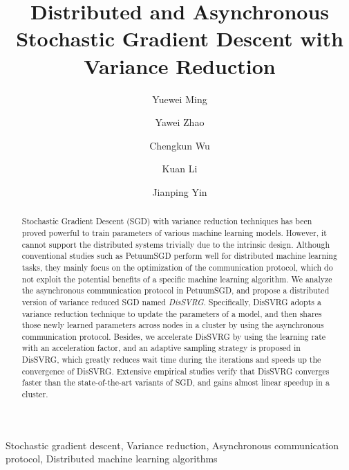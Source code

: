 \documentclass[preprint,review,11pt,a4paper]{elsarticle}
\begin{document}
\begin{frontmatter}

\title{Distributed and Asynchronous Stochastic Gradient Descent with Variance Reduction}

\author[mymainaddress]{Yuewei Ming}

\author[mymainaddress]{Yawei Zhao}
\author[mymainaddress]{Chengkun Wu}
\author[mymainaddress]{Kuan Li}
\author[mysecondaryaddress]{Jianping Yin}
\address[mymainaddress]{College of Computer,\\ National University of Defense Technology, Changsha 410073, China}
\address[mysecondaryaddress]{State Key Laboratory of High Performance Computing,\\ National University of Defense Technology, Changsha, 410073, China}

\begin{abstract}
Stochastic Gradient Descent (SGD) with variance reduction techniques has been proved powerful to train parameters of various machine learning models. However, it cannot support the distributed systems trivially due to the intrinsic design.  Although conventional studies such as PetuumSGD perform well for distributed machine learning tasks, they mainly focus on the optimization of the communication protocol, which do not exploit the potential benefits of a specific machine learning algorithm. We analyze the asynchronous communication protocol in PetuumSGD, and propose a distributed version of variance reduced SGD named \emph{DisSVRG}. Specifically, DisSVRG adopts a variance reduction technique to update the parameters of a model, and then shares those newly learned parameters across nodes in a cluster by using the asynchronous communication protocol. Besides, we accelerate DisSVRG by using the learning rate with an acceleration factor, and an adaptive sampling strategy is proposed in DisSVRG, which greatly reduces wait time during the iterations and speeds up the convergence of DisSVRG. Extensive empirical studies verify that DisSVRG  converges faster than the state-of-the-art variants of SGD, and gains almost linear speedup in a cluster.
\end{abstract}

\begin{keyword}
Stochastic gradient descent, Variance reduction, Asynchronous communication protocol, Distributed machine learning algorithms
\end{keyword}

\end{frontmatter}
\end{document}
